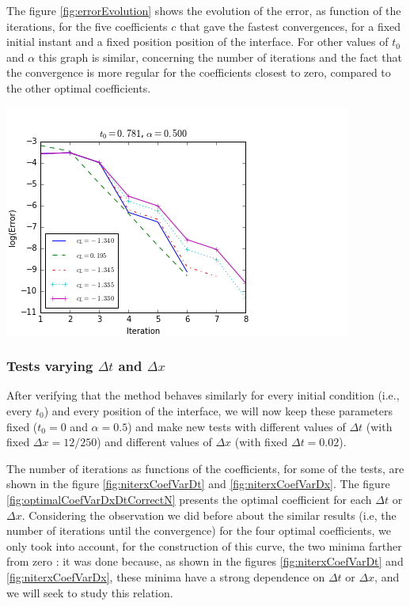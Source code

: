 \indent The figure \ref{fig:errorEvolution} shows the evolution of the error, as function of the iterations, for the five coefficients $c$ that gave the fastest convergences, for a fixed initial instant and a fixed position position of the interface. For other values of $t_0$ and $\alpha$ this graph is similar, concerning the number of iterations and the fact that the convergence is more regular for the coefficients closest to zero, compared to the other optimal coefficients.

\begingroup
\begin{center}
\includegraphics[scale=.5]{figures/FinalFigures/errorEvolutionFixedT0BFinalVersion.png}
\end{center}
\endgroup

\subsubsection{Tests varying $\Delta t$ and $\Delta x$}

\indent After verifying that the method behaves similarly for every initial condition (i.e., every $t_0$) and every position of the interface, we will now keep these parameters fixed ($t_0 = 0$ and $\alpha = 0.5$) and make new tests with different values of $\Delta t$ (with fixed $\Delta x = 12/250$) and different values of $\Delta x$ (with fixed $\Delta t = 0.02$).

\indent The number of iterations as functions of the coefficients, for some of the tests, are shown in the figure \ref{fig:niterxCoefVarDt} and \ref{fig:niterxCoefVarDx}. The figure \ref{fig:optimalCoefVarDxDtCorrectN} presents the optimal coefficient for each $\Delta t$ or $\Delta x$. Considering the observation we did before about the similar results (i.e, the number of iterations until the convergence) for the four optimal coefficients, we only took into account, for the construction of this curve, the two minima farther from zero : it was done because, as shown  in the figures \ref{fig:niterxCoefVarDt} and \ref{fig:niterxCoefVarDx}, these minima have a strong dependence on $\Delta t$ or $\Delta x$, and we will seek to study this relation.


